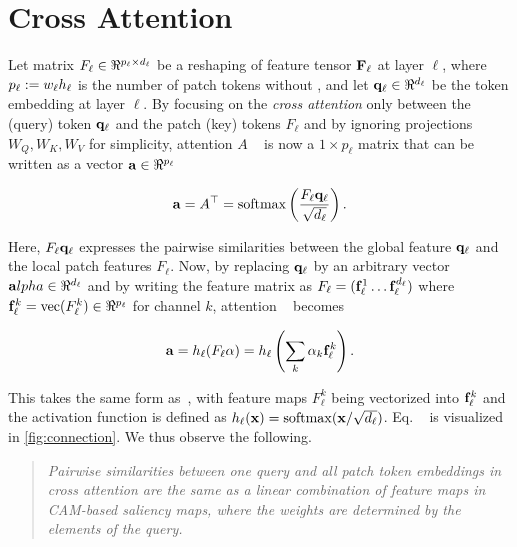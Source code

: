 \section {Cross Attention}
\label{sec:ca_defn}
Let matrix $F_\ell \in \real^{p_\ell \times d_\ell}$ be a reshaping of feature tensor $\mathbf{F}_\ell$ at
 layer $\ell$, where $p_\ell \mathrel{:=} w_\ell h_\ell$ is the number of patch tokens without \cls, and
  let $\vq_\ell \in \real^{d_\ell}$ be the \cls token embedding at layer $\ell$. By focusing on the 
  \emph{cross attention} only between the \cls (query) token $\mathbf{q}_\ell$ and the patch (key) tokens 
  $F_\ell$ and by ignoring projections $W_Q, W_K, W_V$ for simplicity, attention $A$ ~ 
  is now a $1 \times p_\ell$ matrix that can be written as a vector $\mathbf{a} \in \real^{p_\ell}$

\begin{equation}
	\mathbf{a} = A^\top = \operatorname{softmax} \left( \frac{F_\ell \mathbf{q}_\ell}{\sqrt{d_\ell}} \right).
\label{eq:cross-attention}
\end{equation}

Here, $F_\ell \mathbf{q}_\ell$ expresses the pairwise similarities between the global \cls feature 
$\mathbf{q}_\ell$ and the local patch features $F_\ell$. Now, by replacing $\mathbf{q}_\ell$ by an arbitrary vector 
$\mathbf{a}lpha \in \real^{d_\ell}$ and by writing the feature matrix as $F_\ell = (\mathbf{f}_\ell^1 \dots 
\mathbf{f}_\ell^{d_\ell})$ where $\vf_\ell^k = \vect(F_\ell^k) \in \real^{p_\ell}$ for channel $k$, 
attention ~ becomes

\begin{equation}
	\mathbf{a} = h_\ell (F_\ell \mathbf{\alpha}) =
		h_\ell \left( \sum_k \alpha_k \mathbf{f}_\ell^k \right).
\label{eq:connection}
\end{equation}

This takes the same form as~, with feature maps $F_\ell^k$ being vectorized into 
$\mathbf{f}_\ell^k$ and the activation function is defined as $h_\ell(\mathbf{x}) = \operatorname{softmax}(\mathbf{x} / \sqrt{d_\ell})$. 
Eq. ~ is visualized in \autoref{fig:connection}. We thus observe the following.

\begin{quote}
	\emph{Pairwise similarities between one query and all patch token embeddings in cross attention 
	are the same as a linear combination of feature maps in CAM-based saliency maps, where the 
	weights are determined by the elements of the query.}
\end{quote}

